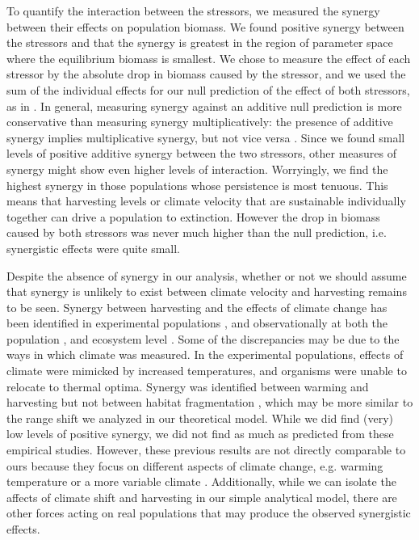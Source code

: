 \documentclass[12pt,english]{article}
\begin{document}
\begin{spacing}{1.9}
\begin{flushleft}
To quantify the interaction between the stressors, we measured the synergy between their effects on population biomass.  We found positive synergy between the stressors and that the synergy is greatest in the region of parameter space where the equilibrium biomass is smallest.  We chose to measure the effect of each stressor by the absolute drop in biomass caused by the stressor, and we used the sum of the individual effects for our null prediction of the effect of both stressors, as in \cite{Crainetal2008, DarlingCote2008,Nyeetal2013}.  In general, measuring synergy against an additive null prediction is more conservative than measuring synergy multiplicatively: the presence of additive synergy implies multiplicative synergy, but not vice versa \citep{Crainetal2008, Foltetal1999}.  Since we found small levels of positive additive synergy between the two stressors, other measures of synergy might show even higher levels of interaction. Worryingly, we find the highest synergy in those populations whose persistence is most tenuous.  This means that harvesting levels or climate velocity that are sustainable individually together can drive a population to extinction.  However the drop in biomass caused by both stressors was never much higher than the null prediction, i.e. synergistic effects were quite small.

Despite the absence of synergy in our analysis, whether or not we should assume that synergy is unlikely to exist between climate velocity and harvesting remains to be seen. Synergy between harvesting and the effects of climate change has been identified in experimental populations \citep{Moraetal2007}, and observationally at both the population \citep{Planque:2010uq}, and ecosystem level \citep{Kirby:2009fk,Planque:2010uq}.  Some of the discrepancies may be due to the ways in which climate was measured. In the experimental populations, effects of climate were mimicked by increased temperatures, and organisms were unable to relocate to thermal optima. Synergy was identified between warming and harvesting but not between habitat fragmentation \citep{Moraetal2007}, which may be more similar to the range shift we analyzed in our theoretical model.  While we did find (very) low levels of positive synergy, we did not find as much as predicted from these empirical studies.  However, these previous results are not directly comparable to ours because they focus on different aspects of climate change, e.g. warming temperature \citep{Moraetal2007,Kirby:2009fk} or a more variable climate \citep{Planque:2010uq}.  Additionally, while we can isolate the affects of climate shift and harvesting in our simple analytical model, there are other forces acting on real populations that may produce the observed synergistic effects.


\end{flushleft}
\end{spacing}
\end{document}
